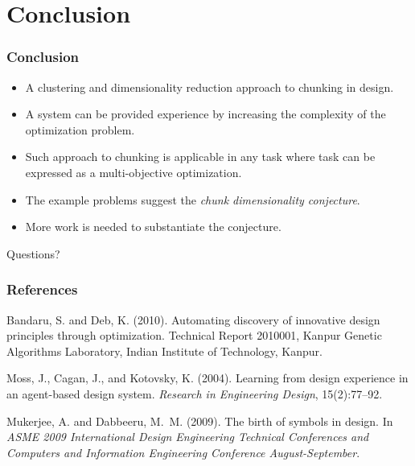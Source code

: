\documentclass[svgnames, table, smaller]{beamer}
\newcommand{\newblock}{}
\begin{document}
\section{Conclusion}

\begin{frame}
  \frametitle{Conclusion}

  \begin{itemize}
  \item A clustering and dimensionality reduction approach to chunking in
    design.
  \item A system can be provided experience by increasing the complexity 
    of the optimization problem.
  \item Such approach to chunking is applicable in any task where task can
    be expressed as a multi-objective optimization.
  \item The example problems suggest the {\em chunk dimensionality
      conjecture}.
  \item More work is needed to substantiate the conjecture.

\end{itemize}

  

\end{frame}

\begin{frame}
\begin{center}
  Questions?
\end{center}
\end{frame}

 
\begin{frame}[allowframebreaks]
  \frametitle{References}

  \begin{thebibliography}{nevell1984unified}
      Bandaru, S. and Deb, K. (2010).
      \newblock Automating discovery of innovative design principles through
      optimization.
      \newblock Technical Report 2010001, Kanpur Genetic Algorithms Laboratory,
      Indian Institute of Technology, Kanpur.


     Moss, J., Cagan, J., and Kotovsky,
      K. (2004).  \newblock Learning from design experience in an
      agent-based design system.  \newblock {\em Research in Engineering
        Design}, 15(2):77--92.

     Mukerjee, A. and
      Dabbeeru, M.~M. (2009).  \newblock The birth of symbols in design.
      \newblock In {\em ASME 2009 International Design Engineering
        Technical Conferences and Computers and Information Engineering
        Conference August-September}.


  \end{thebibliography}
\end{frame}
\end{document}
